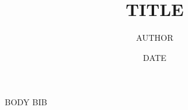 \documentclass[11pt]{article}
{{PREAMBLE}}
\title{{{TITLE}}}
\author{{{AUTHOR}}}
\date{{{DATE}}}
\begin{document}
\maketitle
{{BODY}}
{{BIB}}
\end{document}
